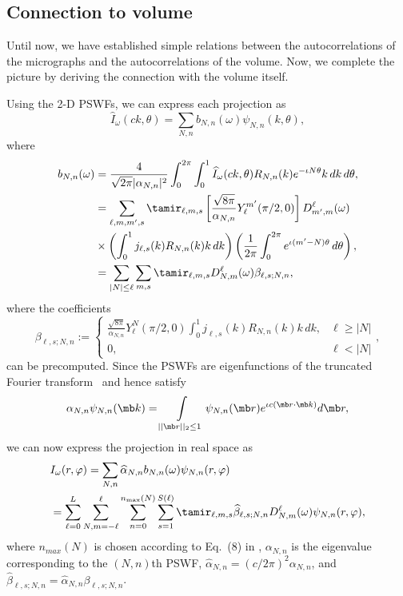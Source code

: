 \documentclass[9pt,twocolumn,twoside,lineno]{pnas-new}
\begin{document}
\subsection{Connection to volume}

Until now, we have established  simple relations between the autocorrelations of the micrographs and the autocorrelations of the volume. Now, we complete the picture by deriving the connection with the volume itself.

Using the 2-D PSWFs, we can express each projection as 
\[ \widehat I_{\omega}(ck,\theta) = \sum_{N,n}b_{N,n}(\omega)\psi_{N,n}(k,\theta),\]
where
\[\begin{aligned} b_{N,n}(\omega) &= \frac{4}{\sqrt{2\pi}|\alpha_{N,n}|^2}\int_0^{2\pi}\int_0^1\widehat I_{\omega}(ck,\theta)R_{N,n}(k)e^{-\iota N\theta}k\, dk\, d\theta,\\
&= \sum_{\ell,m,m',s}\tamir_{\ell,m,s}\left[\frac{\sqrt{8\pi}}{\alpha_{N,n}}Y_{\ell}^{m'}(\pi/2,0)\right]D_{m',m}^{\ell}(\omega)\\&\times \left(\int_0^1j_{\ell,s}(k)R_{N,n}(k)k\, dk\right)\left(\frac{1}{2\pi}\int_0^{2\pi}e^{\iota(m'-N)\theta}\, d\theta\right),\\
&= \sum_{\vert N\vert\leq \ell}\sum_{m,s}\tamir_{\ell,m,s}D_{N,m}^{\ell}(\omega)\beta_{\ell,s;N,n},\end{aligned}\]
where the coefficients
\begin{equation} \label{eq:beta}
\beta_{\ell,s;N,n} := \left\{\begin{array}{ll} \frac{\sqrt{8\pi}}{\alpha_{N,n}}Y_{\ell}^{N}(\pi/2,0)\int_0^1j_{\ell,s}(k)R_{N,n}(k)k\, dk, & \ell\geq |N|\\ 0, & \ell<|N|\end{array}\right.,
\end{equation}
can be precomputed.
Since the PSWFs are eigenfunctions of the truncated Fourier transform~\cite{landa2017steerable} and hence satisfy 
\begin{equation}
\label{eq:PSWF_defn_eq}
\alpha_{N,n}\psi_{N,n}(\mb k) = \int\limits_{||\mb r||_2\leq 1} \psi_{N,n}(\mb r)e^{\iota c(\mb r\cdot\mb k)}d\mb r,
\end{equation} 
we can now express the projection in real space as
\begin{align} \label{eq:proj_expansion}
&I_{\omega}(r,\varphi) = \sum_{N,n}\widehat{\alpha}_{N,n}b_{N,n}(\omega)\psi_{N,n}(r,\varphi)\\
&= \sum_{\ell=0}^L\sum_{N,m=-\ell}^{\ell}\sum_{n=0}^{n_{\text{max}}(N)}\sum_{s=1}^{S(\ell)}\tamir_{\ell,m,s}\widehat\beta_{\ell,s;N,n}D_{N,m}^{\ell}(\omega)\psi_{N,n}(r,\varphi), \nonumber 
\end{align}
where $n_{max}(N)$ is chosen according to Eq.~(8) in \cite{landa2017steerable}, $\alpha_{N,n}$ is the eigenvalue corresponding to the $(N,n)$th PSWF, $\widehat{\alpha}_{N,n} = (c/2\pi)^2\alpha_{N,n}$, and $\widehat\beta_{\ell,s;N,n}=\widehat\alpha_{N,n}\beta_{\ell,s;N,n}$.
\end{document}
